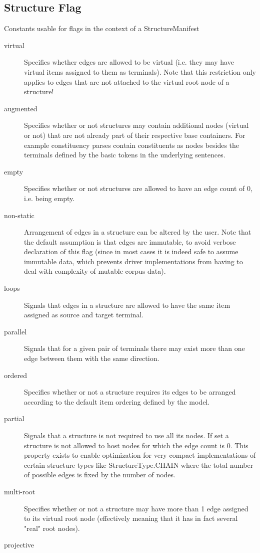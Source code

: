 \documentclass[11pt,a4paper]{report}
\begin{document}
\subsection{Structure Flag}
Constants usable for flags in the context of a StructureManifest
\label{sec:enum-structure-flag}
\begin{description}
	\item[virtual] Specifies whether edges are allowed to be virtual (i.e. they may have virtual items assigned to them as terminals). Note that this restriction only applies to edges that are not attached to the virtual root node of a structure!
	\item[augmented] Specifies whether or not structures may contain additional nodes (virtual or not) that are not already part of their respective base containers. For example constituency parses contain constituents as nodes besides the terminals defined by the basic tokens in the underlying sentences.
	\item[empty] Specifies whether or not structures are allowed to have an edge count of 0, i.e. being empty.
	\item[non-static] Arrangement of edges in a structure can be altered by the user. Note that the default assumption is that edges are immutable, to avoid verbose declaration of this flag (since in most cases it is indeed safe to assume immutable data, which prevents driver implementations from having to deal with complexity of mutable corpus data).
	\item[loops] Signals that edges in a structure are allowed to have the same item assigned as source and target terminal.
	\item[parallel] Signals that for a given pair of terminals there may exist more than one edge between them with the same direction.
	\item[ordered] Specifies whether or not a structure requires its edges to be arranged according to the default item ordering defined by the model.
	\item[partial] Signals that a structure is not required to use all its nodes. If set a structure is not allowed to host nodes for which the edge count is 0. This property exists to enable optimization for very compact implementations of certain structure types like StructureType.CHAIN where the total number of possible edges is fixed by the number of nodes.
	\item[multi-root] Specifies whether or not a structure may have more than 1 edge assigned to its virtual root node (effectively meaning that it has in fact several "real" root nodes).
	\item[projective] 
\end{description}
\end{document}
